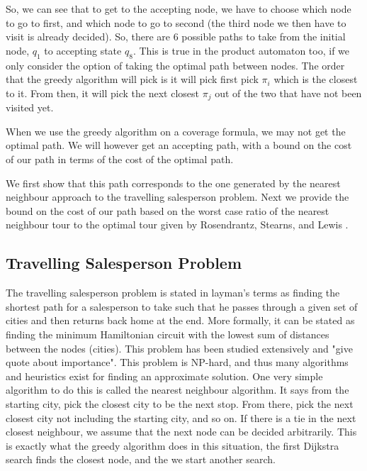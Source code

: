 So, we can see that to get to the accepting node, we have to choose which node to go to first, and which node to go to second (the third node we then have to visit is already decided). So, there are 6 possible paths to take from the initial node, $q_1$ to accepting state $q_8$. This is true in the product automaton too, if we only consider the option of taking the optimal path between nodes. The order that the greedy algorithm will pick is it will pick first pick $\pi_i$ which is the closest to it. From then, it will pick the next closest $\pi_j$ out of the two that have not been visited yet.



When we use the greedy algorithm on a coverage formula, we may not get the optimal path. We will however get an accepting path, with a bound on the cost of our path in terms of the cost of the optimal path. 

We first show that this path corresponds to the one generated by the nearest neighbour approach to the travelling salesperson problem. Next we provide the bound on the cost of our path based on the worst case ratio of the nearest neighbour tour to the optimal tour given by Rosendrantz, Stearns, and Lewis \cite{rosenkrantz74}. 

\subsection{Travelling Salesperson Problem}
The travelling salesperson problem is stated in layman's terms as finding the shortest path for a salesperson to take such that he passes through a given set of cities and then returns back home at the end. More formally, it can be stated as finding the minimum Hamiltonian circuit with the lowest sum of distances between the nodes (cities). This problem has been studied extensively and "give quote about importance". This problem is NP-hard, and thus many algorithms and heuristics exist for finding an approximate solution. One very simple algorithm to do this is called the nearest neighbour algorithm. It says from the starting city, pick the closest city to be the next stop. From there, pick the next closest city not including the starting city, and so on. If there is a tie in the next closest neighbour, we assume that the next node can be decided arbitrarily. This is exactly what the greedy algorithm does in this situation, the first Dijkstra search finds the closest node, and the we start another search. 

